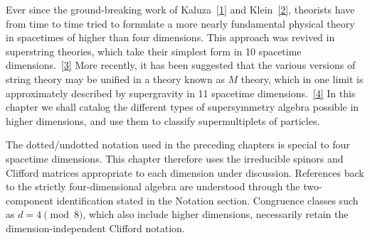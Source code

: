 
Ever since the ground-breaking work of Kaluza~\hyperref[ch32-ref-1]{[1]}
and Klein~\hyperref[ch32-ref-2]{[2]}, theorists have from time to time
tried to formulate a more nearly fundamental physical theory in spacetimes
of higher than four dimensions. This approach was revived in superstring
theories, which take their simplest form in 10 spacetime
dimensions.~\hyperref[ch32-ref-3]{[3]} More recently, it has been suggested
that the various versions of string theory may be unified in a theory known
as \(M\) theory, which in one limit is approximately described by
supergravity in 11 spacetime dimensions.~\hyperref[ch32-ref-4]{[4]} In this
chapter we shall catalog the different types of supersymmetry algebra
possible in higher dimensions, and use them to classify supermultiplets of
particles.

The dotted/undotted notation used in the preceding chapters is special to
four spacetime dimensions.  This chapter therefore uses the irreducible
spinors and Clifford matrices appropriate to each dimension under
discussion.  References back to the strictly four-dimensional algebra are
understood through the two-component identification stated in the Notation
section.  Congruence classes such as \(d=4\pmod 8\), which also include
higher dimensions, necessarily retain the dimension-independent Clifford
notation.
